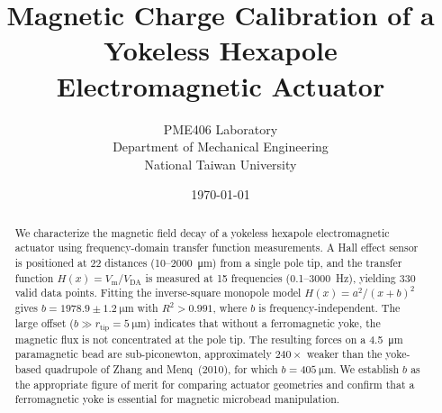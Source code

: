 \documentclass[11pt,a4paper]{article}
\title{Magnetic Charge Calibration of a Yokeless Hexapole\\
Electromagnetic Actuator}
\author{%
  PME406 Laboratory\\
  Department of Mechanical Engineering\\
  National Taiwan University
}
\date{\today}
\begin{document}
\maketitle

\begin{abstract}
We characterize the magnetic field decay of a yokeless hexapole electromagnetic
actuator using frequency-domain transfer function measurements. A Hall effect
sensor is positioned at 22 distances (10--\SI{2000}{\um}) from a single pole
tip, and the transfer function $H(x) = V_\mathrm{m}/V_\mathrm{DA}$ is
measured at 15 frequencies (0.1--\SI{3000}{\hertz}), yielding 330 valid
data points. Fitting the inverse-square monopole model
$H(x) = a^2/(x+b)^2$ gives $b = 1978.9 \pm \SI{1.2}{\um}$ with
$R^2 > 0.991$, where $b$ is frequency-independent. The large offset
($b \gg r_\mathrm{tip} = \SI{5}{\um}$) indicates that without a ferromagnetic
yoke, the magnetic flux is not concentrated at the pole tip. The resulting
forces on a \SI{4.5}{\um} paramagnetic bead are sub-piconewton, approximately
$240\times$ weaker than the yoke-based quadrupole of Zhang and
Menq~(2010), for which $b = \SI{405}{\um}$. We establish $b$ as the
appropriate figure of merit for comparing actuator geometries and confirm that
a ferromagnetic yoke is essential for magnetic microbead manipulation.
\end{abstract}

\tableofcontents
\newpage












\newpage

\end{document}

